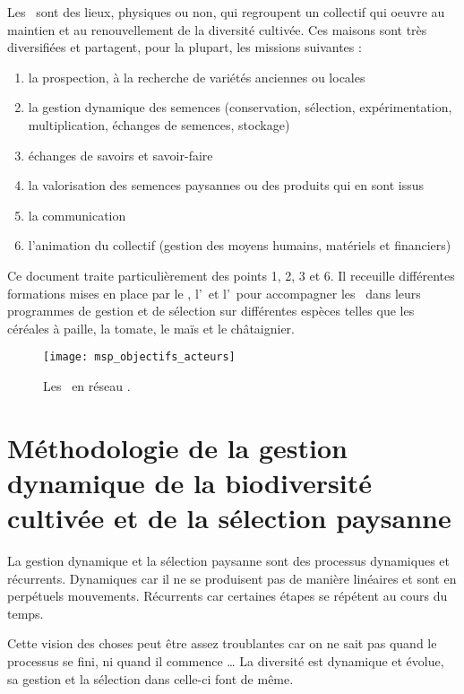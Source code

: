 \begin{multicols}{2}
Les \MSPs~sont des lieux, physiques ou non, qui regroupent un collectif qui oeuvre au maintien et au renouvellement de la diversité cultivée.
Ces maisons sont très diversifiées et partagent, pour la plupart, les missions suivantes \cite{rsp_msp_2014}:

\begin{enumerate}
\item la prospection, à la recherche de variétés anciennes ou locales
\item la  gestion dynamique des semences (conservation, sélection, expérimentation, multiplication, échanges de semences, stockage)
\item échanges de savoirs et savoir-faire
\item la valorisation des semences paysannes ou des produits qui en sont issus
\item la communication
\item l'animation du collectif (gestion des moyens humains, matériels et financiers)
\end{enumerate}

Ce document traite particulièrement des points 1, 2, 3 et 6.
Il receuille différentes formations mises en place par le \RSP, l'\ITAB~et l'\INRA~pour accompagner les \MSPs~dans leurs programmes de gestion et de sélection sur différentes espèces telles que 
les céréales à paille, 
la tomate, 
le maïs et 
le châtaignier.

\columnbreak

\begin{figure}[H]
\centering\texttt{[image: msp\_objectifs\_acteurs]}
\caption{Les \MSPs~en réseau \cite{msp_objectifs_acteurs}.}
\end{figure}

\end{multicols}


\section{Méthodologie de la gestion dynamique de la biodiversité cultivée et de la sélection paysanne}

La gestion dynamique et la sélection paysanne sont des processus dynamiques et récurrents.
Dynamiques car il ne se produisent pas de manière linéaires et sont en perpétuels mouvements.
Récurrents car certaines étapes se répétent au cours du temps.

Cette vision des choses peut être assez troublantes car on ne sait pas quand le processus se fini, ni quand il commence \dots
La diversité est dynamique et évolue, sa gestion et la sélection dans celle-ci font de même.


